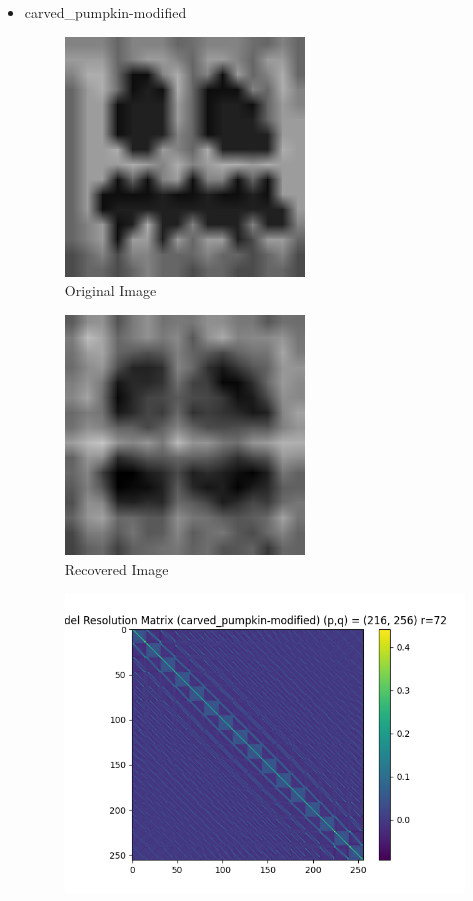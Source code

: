\documentclass{article}
\begin{document}
\begin{itemize}
    \item carved\_pumpkin-modified
\begin{figure}[h]
    \centering
    \includegraphics[width=0.6\textwidth]{images/greyscale/carved_pumpkin-modified.png}
    \caption{Original Image}
\end{figure}
\begin{figure}[h]
    \centering
    \includegraphics[width=0.6\textwidth]{images/outputs/carved_pumpkin-modified.png}
    \caption{Recovered Image}
\end{figure}
\begin{figure}[h]
    \centering
    \includegraphics[width=1\textwidth]{images/outputs/modelres/carved_pumpkin-modified.png}

\end{figure}
\end{itemize}
\end{document}
